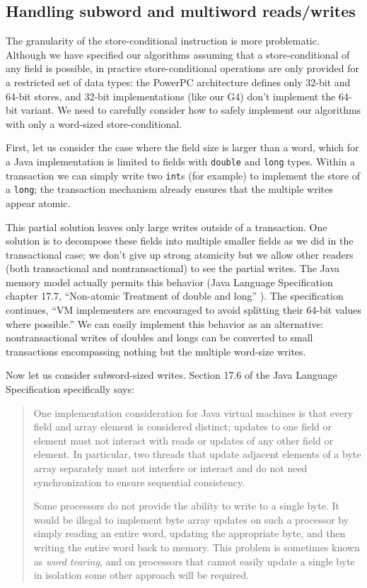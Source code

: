 \subsection{Handling subword and multiword reads/writes}
\label{sec:multiword}
The granularity of the store-conditional instruction is more
problematic.  Although we have specified our algorithms assuming that
a store-conditional of any field is possible, in practice
store-conditional operations are only provided for a restricted set of
data types: the PowerPC architecture defines only 32-bit and 64-bit
stores, and 32-bit implementations (like our G4) don't implement the 64-bit
variant.  We need to carefully consider how to safely implement our
algorithms with only a word-sized store-conditional.

First, let us consider the case where the field size is larger than a
word, which for a Java implementation is limited to fields with
\texttt{double} and \texttt{long} types.  Within a transaction we can
simply write two \texttt{int}s (for example) to implement the store of
a \texttt{long}; the transaction mechanism already ensures that the
multiple writes appear atomic.

This partial solution leaves only large writes outside of a transaction.  One
solution is to decompose these fields into multiple smaller fields as
we did in the transactional case; we don't give up strong atomicity
but we allow other readers (both transactional and nontransactional)
to see the partial writes.  The Java memory model actually permits
this behavior (Java Language Specification chapter 17.7,
``Non-atomic Treatment of double and long'' \cite{JLS3}).  The specification
continues, ``VM implementers are encouraged to avoid splitting their
64-bit values where possible.''  We can easily implement this behavior
as an alternative: nontransactional writes of doubles and longs can be
converted to small transactions encompassing nothing but the multiple
word-size writes.

Now let us consider subword-sized writes.  Section 17.6 of the Java
Language Specification specifically says:
\begin{quote}
One implementation consideration for Java virtual machines is that
every field and array element is considered distinct; updates to one
field or element must not interact with reads or updates of any other
field or element. In particular, two threads that update adjacent
elements of a byte array separately must not interfere or interact and
do not need synchronization to ensure sequential consistency.

Some processors do not provide the ability to write to a single
byte. It would be illegal to implement byte array updates on such a
processor by simply reading an entire word, updating the appropriate
byte, and then writing the entire word back to memory. This problem is
sometimes known as \textit{word tearing}, and on processors that cannot easily
update a single byte in isolation some other approach will be
required.
\end{quote}

